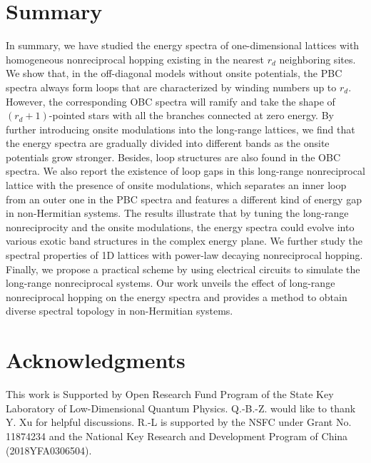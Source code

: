 \documentclass[prb,aps,twocolumn,showpacs]{revtex4-2} %
\begin{document}
\section{Summary}\label{sect7}
In summary, we have studied the energy spectra of one-dimensional lattices with homogeneous nonreciprocal hopping existing in the nearest $r_d$ neighboring sites. We show that, in the off-diagonal models without onsite potentials, the PBC spectra always form loops that are characterized by winding numbers up to $r_d$. However, the corresponding OBC spectra will ramify and take the shape of $(r_d+1)$-pointed stars with all the branches connected at zero energy. By further introducing onsite modulations into the long-range lattices, we find that the energy spectra are gradually divided into different bands as the onsite potentials grow stronger. Besides, loop structures are also found in the OBC spectra. We also report the existence of loop gaps in this long-range nonreciprocal lattice with the presence of onsite modulations, which separates an inner loop from an outer one in the PBC spectra and features a different kind of energy gap in non-Hermitian systems. The results illustrate that by tuning the long-range nonreciprocity and the onsite modulations, the energy spectra could evolve into various exotic band structures in the complex energy plane. We further study the spectral properties of 1D lattices with power-law decaying nonreciprocal hopping. Finally, we propose a practical scheme by using electrical circuits to simulate the long-range nonreciprocal systems. Our work unveils the effect of long-range nonreciprocal hopping on the energy spectra and provides a method to obtain diverse spectral topology in non-Hermitian systems. 

\section*{Acknowledgments}
This work is Supported by Open Research Fund Program of the State Key Laboratory of Low-Dimensional Quantum Physics. Q.-B.-Z. would like to thank Y. Xu for helpful discussions. R.-L is supported by the NSFC under Grant No. 11874234 and the National Key Research and Development Program of China (2018YFA0306504).

%
\end{document}
